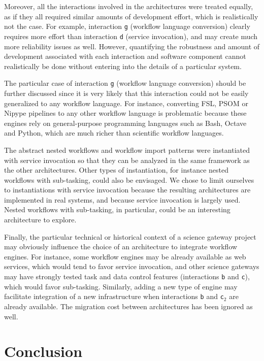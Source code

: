 \documentclass[preprint,3p,twocolumn]{elsarticle}
\begin{document}
Moreover, all the interactions involved in the architectures were
treated equally, as if they all required similar amounts of
development effort, which is realistically not the case. For example,
interaction \texttt{g} (workflow language conversion) clearly requires
more effort than interaction \texttt{d} (service invocation), and may
create much more reliability issues as well. However, quantifying the
robustness and amount of development associated with each interaction
and software component cannot realistically be done without entering
into the details of a particular system.

The particular case of interaction \texttt{g} (workflow language
conversion) should be further discussed since it is very likely that
this interaction could not be easily generalized to any workflow
language. For instance, converting FSL, PSOM or Nipype pipelines to
any other workflow language is problematic because these engines rely
on general-purpose programming languages such as Bash, Octave and
Python, which are much richer than scientific workflow languages.

The abstract nested workflows and workflow import patterns were
instantiated with service invocation so that they can be analyzed in
the same framework as the other architectures. Other types of
instantiation, for instance nested workflows with sub-tasking, could
also be envisaged. We chose to limit ourselves to instantiations with
service invocation because the resulting architectures are implemented
in real systems, and because service invocation is largely
used. Nested workflows with sub-tasking, in particular, could be an
interesting architecture to explore.

Finally, the particular technical or historical context of a science
gateway project may obviously influence the choice of an architecture
to integrate workflow engines. For instance, some workflow engines may
be already available as web services, which would tend to favor
service invocation, and other science gateways may have strongly
tested task and data control features (interactions \texttt{b} and
\texttt{c}), which would favor sub-tasking. Similarly, adding a new
type of engine may facilitate integration of a new infrastructure when
interactions \texttt{b} and \texttt{c$_2$} are already available. The
migration cost between architectures has been ignored as well.

\section{Conclusion}
\end{document}
